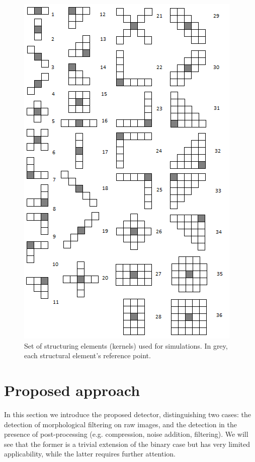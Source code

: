 \documentclass{ieeeaccess}
\begin{document}
\begin{figure}[!t]
	\centering
	\includegraphics[width=\linewidth]{masks.png}
	\caption{Set of structuring elements (kernels) used for simulations. In grey, each structural element's reference point.}
	\label{fig:masks}
\end{figure}

\section{Proposed approach}
\label{sec:method}

In this section we introduce the proposed detector, distinguishing two cases: the detection of morphological filtering on raw images, and the detection in the presence of post-processing (e.g. compression, noise addition, filtering). We will see that the former is a trivial extension of the binary case but has very limited applicability, while the latter requires further attention.
\end{document}
